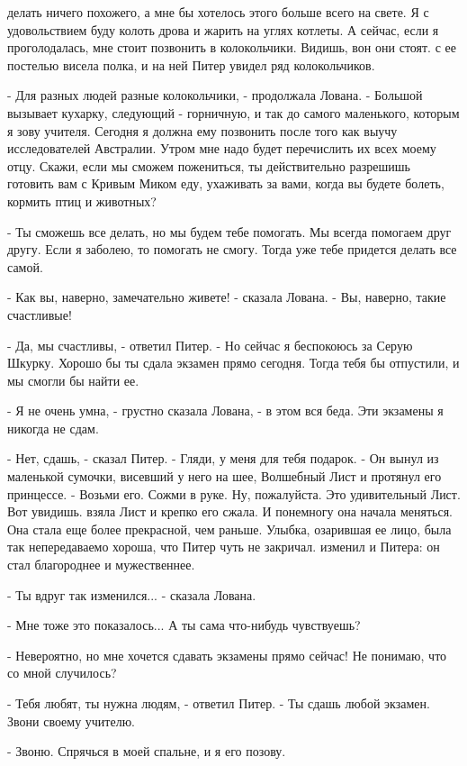 делать ничего похожего, а мне бы хотелось этого больше всего на свете. 
Я с удовольствием буду колоть дрова и жарить на углях котлеты. А 
сейчас, если я проголодалась, мне стоит позвонить в колокольчики. 
Видишь, вон они стоят.
 с ее постелью висела полка, и на ней Питер увидел ряд 
колокольчиков.
\par- Для разных людей разные колокольчики, - продолжала Лована. - 
Большой вызывает кухарку, следующий - горничную, и так до самого 
маленького, которым я зову учителя. Сегодня я должна ему позвонить 
после того как выучу исследователей Австралии. Утром мне надо будет 
перечислить их всех моему отцу. Скажи, если мы сможем пожениться, ты 
действительно разрешишь готовить вам с Кривым Миком еду, ухаживать за 
вами, когда вы будете болеть, кормить птиц и животных?
\par- Ты сможешь все делать, но мы будем тебе помогать. Мы всегда 
помогаем друг другу. Если я заболею, то помогать не смогу. Тогда уже 
тебе придется делать все самой.
\par- Как вы, наверно, замечательно живете! - сказала Лована. - Вы, 
наверно, такие счастливые!
\par- Да, мы счастливы, - ответил Питер. - Но сейчас я беспокоюсь за 
Серую Шкурку. Хорошо бы ты сдала экзамен прямо сегодня. Тогда тебя бы 
отпустили, и мы смогли бы найти ее.
\par- Я не очень умна, - грустно сказала Лована, - в этом вся беда. 
Эти экзамены я никогда не сдам.
\par- Нет, сдашь, - сказал Питер. - Гляди, у меня для тебя подарок. - 
Он вынул из маленькой сумочки, висевший у него на шее, Волшебный Лист 
и протянул его принцессе. - Возьми его. Сожми в руке. Ну, пожалуйста. 
Это удивительный Лист. Вот увидишь.
 взяла Лист и крепко его сжала. И понемногу она начала 
меняться. Она стала еще более прекрасной, чем раньше. Улыбка, 
озарившая ее лицо, была так непередаваемо хороша, что Питер чуть не 
закричал.
 изменил и Питера: он стал благороднее и мужественнее.
\par- Ты вдруг так изменился... - сказала Лована.
\par- Мне тоже это показалось... А ты сама что-нибудь чувствуешь?
\par- Невероятно, но мне хочется сдавать экзамены прямо сейчас! Не 
понимаю, что со мной случилось?
\par- Тебя любят, ты нужна людям, - ответил Питер. - Ты сдашь любой 
экзамен. Звони своему учителю.
\par- Звоню. Спрячься в моей спальне, и я его позову.
